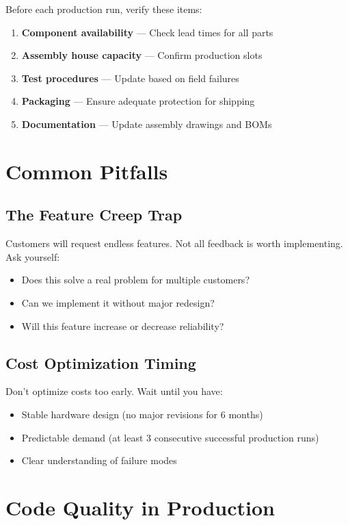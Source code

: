 Before each production run, verify these items:

\begin{enumerate}
\item \textbf{Component availability} — Check lead times for all parts
\item \textbf{Assembly house capacity} — Confirm production slots
\item \textbf{Test procedures} — Update based on field failures
\item \textbf{Packaging} — Ensure adequate protection for shipping
\item \textbf{Documentation} — Update assembly drawings and BOMs
\end{enumerate}

\section{Common Pitfalls}

\subsection{The Feature Creep Trap}

Customers will request endless features. Not all feedback is worth implementing. Ask yourself:
\begin{itemize}
\item Does this solve a real problem for multiple customers?
\item Can we implement it without major redesign?
\item Will this feature increase or decrease reliability?
\end{itemize}

\subsection{Cost Optimization Timing}

Don't optimize costs too early. Wait until you have:
\begin{itemize}
\item Stable hardware design (no major revisions for 6 months)
\item Predictable demand (at least 3 consecutive successful production runs)
\item Clear understanding of failure modes
\end{itemize}

\section{Code Quality in Production}


